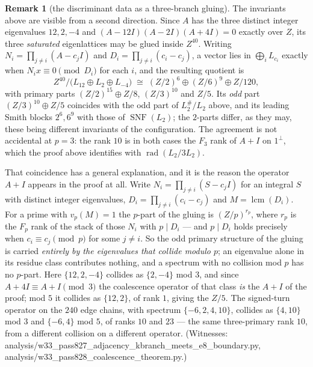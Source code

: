 \documentclass[12pt,a4paper]{article}
\def\mathbb#1{#1}%
\def\mathbf#1{#1}%
\def\texttt#1{#1}%
\theoremstyle{definition}
\newtheorem{remark}[theorem]{Remark}
\begin{document}
\begin{remark}[the discriminant data as a three-branch gluing]
\label{rem:e8-kbranch}
The invariants above are visible from a second direction. Since $A$ has the
three distinct integer eigenvalues $12,2,-4$ and $(A-12I)(A-2I)(A+4I)=0$
exactly over $\mathbb Z$, its three \emph{saturated} eigenlattices may be glued
inside $\mathbb Z^{40}$. Writing $N_i=\prod_{j\neq i}(A-c_jI)$ and
$D_i=\prod_{j\neq i}(c_i-c_j)$, a vector lies in $\bigoplus_i L_{c_i}$ exactly
when $N_i x\equiv 0 \pmod{D_i}$ for each $i$, and the resulting quotient is
\[
 \mathbb Z^{40}\big/\bigl(L_{12}\oplus L_2\oplus L_{-4}\bigr)
 \;\cong\;(\mathbb Z/2)^{6}\oplus(\mathbb Z/6)^{9}\oplus\mathbb Z/120 ,
\]
with primary parts $(\mathbb Z/2)^{15}\oplus\mathbb Z/8$, $(\mathbb Z/3)^{10}$
and $\mathbb Z/5$. Its \emph{odd} part $(\mathbb Z/3)^{10}\oplus\mathbb Z/5$
coincides with the odd part of $L_2^{\#}/L_2$ above, and its leading Smith
blocks $2^6,6^9$ with those of $\operatorname{SNF}(L_2)$; the $2$-parts differ,
as they may, these being different invariants of the configuration. The
agreement is not accidental at $p=3$: the rank $10$ is in both cases the
$\mathbb F_3$ rank of $A+I$ on $\mathbf 1^{\perp}$, which the proof above
identifies with $\operatorname{rad}(L_2/3L_2)$.

That coincidence has a general explanation, and it is the reason the operator
$A+I$ appears in the proof at all. Write $N_i=\prod_{j\neq i}(S-c_jI)$ for an
integral $S$ with distinct integer eigenvalues, $D_i=\prod_{j\neq i}(c_i-c_j)$
and $M=\operatorname{lcm}(D_i)$. For a prime with $v_p(M)=1$ the $p$-part of the
gluing is $(\mathbb Z/p)^{r_p}$, where $r_p$ is the $\mathbb F_p$ rank of the
stack of those $N_i$ with $p\mid D_i$ --- and $p\mid D_i$ holds precisely when
$c_i\equiv c_j \pmod p$ for some $j\neq i$. So the odd primary structure of the
gluing is carried \emph{entirely by the eigenvalues that collide modulo $p$};
an eigenvalue alone in its residue class contributes nothing, and a spectrum
with no collision mod $p$ has no $p$-part. Here $\{12,2,-4\}$ collides as
$\{2,-4\}$ mod $3$, and since $A+4I\equiv A+I \pmod 3$ the coalescence operator
of that class \emph{is} the $A+I$ of the proof; mod $5$ it collides as
$\{12,2\}$, of rank $1$, giving the $\mathbb Z/5$. The signed-turn operator on
the $240$ edge chains, with spectrum $\{-6,2,4,10\}$, collides as $\{4,10\}$
mod $3$ and $\{-6,4\}$ mod $5$, of ranks $10$ and $23$ --- the same three-primary
rank $10$, from a different collision on a different operator.
(Witnesses: \texttt{analysis/w33\_pass827\_adjacency\_kbranch\_meets\_e8\_boundary.py},
\texttt{analysis/w33\_pass828\_coalescence\_theorem.py}.)
\end{remark}
\end{document}
